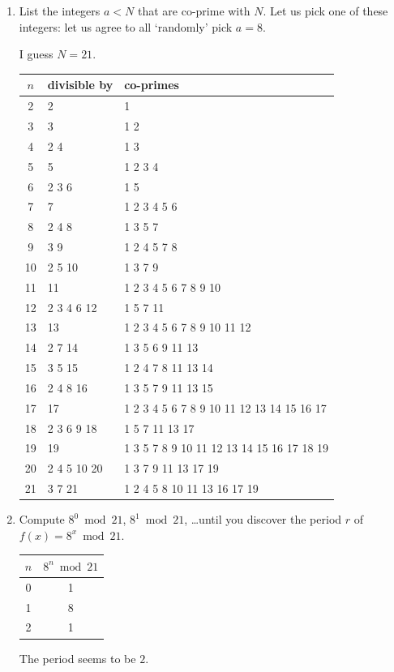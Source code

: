 \documentclass[12pt]{article}
\newenvironment{answer}{\begingroup\setlength{\leftskip}{-\leftmargin}\begin{framed}}{\end{framed}\endgroup}
\begin{document}
\begin{enumerate}
    \item List the integers $a < N$ that are co-prime with $N$. Let us pick one of these integers: let us agree to all `randomly' pick $a = 8$.

    \begin{answer}
        I guess $N = 21$.
        \begin{tabular}{c|l|l}
            $n$ & divisible by & co-primes\\
            \hline
            2 & 2 & 1 \\
            3 & 3 & 1 2 \\
            4 & 2 4 & 1 3 \\
            5 & 5 & 1 2 3 4 \\
            6 & 2 3 6 & 1 5 \\
            7 & 7 & 1 2 3 4 5 6 \\
            8 & 2 4 8 & 1 3 5 7 \\
            9 & 3 9 & 1 2 4 5 7 8 \\
            10 & 2 5 10 & 1 3 7 9 \\
            11 & 11 & 1 2 3 4 5 6 7 8 9 10 \\
            12 & 2 3 4 6 12 & 1 5 7 11 \\
            13 & 13 & 1 2 3 4 5 6 7 8 9 10 11 12 \\
            14 & 2 7 14 & 1 3 5 6 9 11 13 \\
            15 & 3 5 15 & 1 2 4 7 8 11 13 14 \\
            16 & 2 4 8 16 & 1 3 5 7 9 11 13 15 \\
            17 & 17 & 1 2 3 4 5 6 7 8 9 10 11 12 13 14 15 16 17 \\
            18 & 2 3 6 9 18 & 1 5 7 11 13 17 \\
            19 & 19 & 1 3 5 7 8 9 10 11 12 13 14 15 16 17 18 19 \\
            20 & 2 4 5 10 20 & 1 3 7 9 11 13 17 19 \\
            21 & 3 7 21 & 1 2 4 5 8 10 11 13 16 17 19 \\
        \end{tabular}
    \end{answer}

    \item Compute $8^0 \bmod 21$, $8^1 \bmod 21$, \ldots until you discover the period $r$ of $f(x) = 8^x \bmod 21$.

    \begin{answer}
        \begin{tabular}{c|c}
            $n$ & $8^n \bmod 21$ \\
            \hline
            0 & 1 \\
            1 & 8 \\
            2 & 1 \\
        \end{tabular}
        The period seems to be $2$.
    \end{answer}


\end{enumerate}
\end{document}
